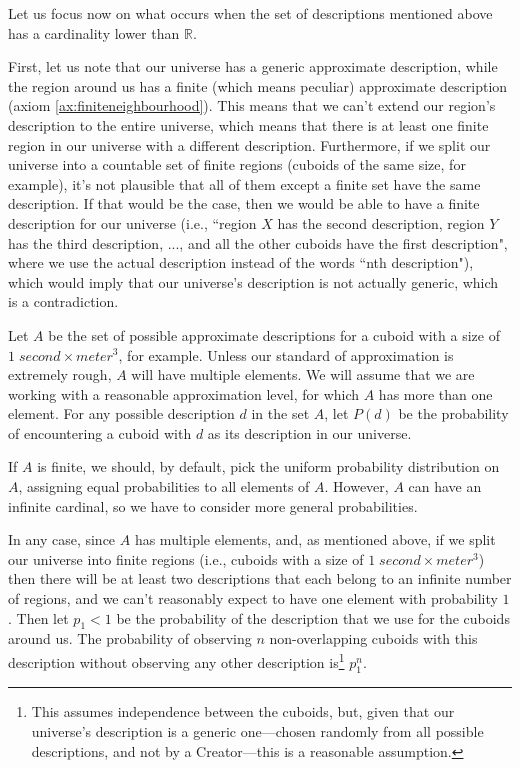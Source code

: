 \documentclass[a4paper
,draft
]{article}
\def\reale{\mathbb{R}}
\newcommand{\ghilimele}[1]{``#1"}
\begin{document}
Let us focus now on what occurs when the set of descriptions mentioned above
has a cardinality lower than $\reale$.

First, let us note that our universe has a generic approximate description,
while the region around us has a finite (which means peculiar) approximate
description (axiom \ref{ax:finiteneighbourhood}).
This means that we can't
extend our region's description to the entire universe, which means that
there is at least one finite region in our universe with a different
description.
Furthermore, if we split our universe into a countable set of finite regions
(cuboids of the same size, for example),
it's not plausible that all of them except a finite set have the same
description.
If that would be the case, then we would be able to
have a finite description for our universe
(i.e., \ghilimele{region $X$ has the second description,
region $Y$ has the third description, ..., and all the other cuboids have the
first description}, where we use the actual description instead of the words
\ghilimele{nth description}), which would imply that our universe's description
is not actually generic, which is a contradiction.

Let $A$ be the set of possible approximate descriptions for
a cuboid with a size of $1\;second \times meter^3$, for example.
Unless our standard of approximation is extremely rough,
$A$ will have multiple elements.
We will assume that we are working with a reasonable approximation level,
for which $A$ has more than one element.
For any possible description $d$ in the set $A$,
let $P(d)$ be the probability of encountering
a cuboid with $d$ as its description in our universe.

If $A$ is finite, we should, by default, pick the uniform probability
distribution on $A$, assigning equal probabilities to all elements of $A$.
However, $A$ can have an infinite cardinal,
so we have to consider more general probabilities.

In any case, since $A$ has multiple elements, and, as mentioned above,
if we split our universe into finite regions
(i.e., cuboids with a size of $1\;second \times meter^3$) then there will be
at least two descriptions that each belong to an infinite number of regions,
and we can't reasonably expect to have one element with probability $1$.
Then let $p_1<1$ be the probability of the description that we use for the
cuboids around us.
The probability of observing $n$
non-overlapping cuboids
with this description without observing any other description is\footnote{
  This assumes independence between the cuboids, but, given that our
  universe's description is a generic one---chosen randomly from all possible
  descriptions, and not by a Creator---this is a reasonable assumption.
}
$p_1^n$.
\end{document}
